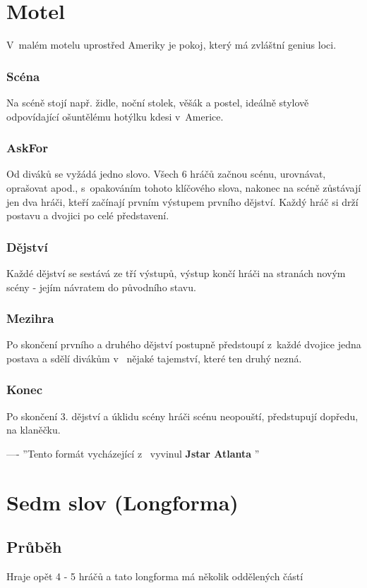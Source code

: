  
 
\needspace{5cm} \section{Motel} \label{motel} V~malém motelu uprostřed Ameriky je pokoj, který má zvláštní genius loci. 
\subsubsection{Scéna} Na scéně stojí např. židle, noční stolek, věšák a postel, ideálně stylově odpovídající ošuntělému hotýlku kdesi v~Americe. 
\subsubsection{AskFor} Od diváků se vyžádá jedno slovo.  
Všech 6 hráčů začnou   scénu, urovnávat, oprašovat apod., s~opakováním tohoto klíčového slova, nakonec na scéně zůstávají jen dva hráči, kteří začínají prvním výstupem prvního dějství. 
Každý hráč si drží postavu a dvojici po celé představení. 
\subsubsection{Dějství} Každé dějství se sestává ze tří výstupů, výstup končí hráči na stranách novým   scény - jejím návratem do původního stavu. 
\subsubsection{Mezihra} Po skončení prvního a druhého dějství postupně předstoupí z~každé dvojice jedna postava a sdělí divákům v~ nějaké tajemství, které ten druhý nezná. 
\subsubsection{Konec} Po skončení 3. dějství a úklidu scény hráči scénu neopouští, předstupují dopředu, na klaněčku. 
 
 
---- 
''Tento formát vycházející z~ vyvinul \textbf{ Jstar Atlanta }'' 
 
\needspace{5cm} \section{Sedm slov (Longforma)} \label{sedm slov (longforma)} \subsection{ Průběh } Hraje opět 4 - 5 hráčů a tato longforma má několik oddělených částí 
 
